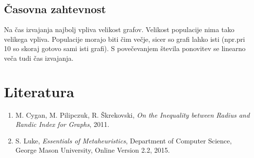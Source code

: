 \documentclass[a4paper, 10pt]{article}
\begin{document}
\subsection{Časovna zahtevnost}
Na čas izvajanja najbolj vpliva velikost grafov. Velikost populacije nima tako velikega vpliva. Populacije morajo biti čim večje, sicer so grafi lahko isti (npr.pri 10 so skoraj gotovo sami isti grafi). S povečevanjem števila ponovitev se linearno veča tudi čas izvajanja.

\pagebreak

\section{Literatura}
\vspace{0.5cm}

\renewcommand{\labelenumi}{[\arabic{enumi}]}
\begin{enumerate}
\item \noindent M. Cygan, M. Pilipczuk, R. Škrekovski, \textsl{On the Inequality between Radius and Randic Index for Graphs}, 2011. 
\vspace{0.5cm}
\item \noindent  S. Luke, \textsl{Essentials of Metaheuristics}, Department of Computer Science, George Mason University, Online Version 2.2, 2015.
\end{enumerate}
\end{document}
